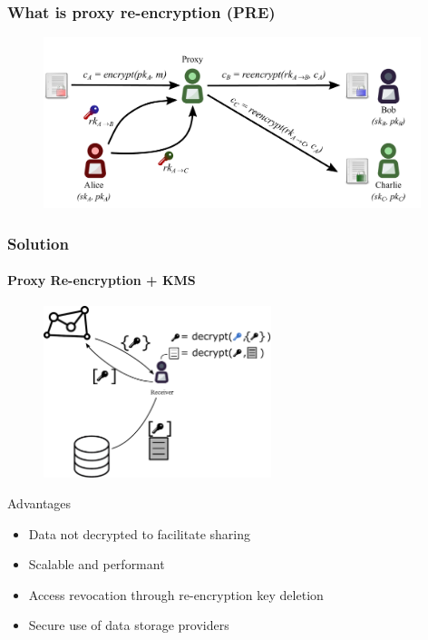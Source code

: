\documentclass[xetex,mathsans,sans]{beamer}
\begin{document}
    \begin{frame}
        \frametitle{What is proxy re-encryption (PRE)}
        \begin{figure}
            \centering
            \includegraphics[width=11cm]{pdf/pre-multi.pdf}
        \end{figure}
    \end{frame}

    \begin{frame}
        \frametitle{Solution}
        \framesubtitle{Proxy Re-encryption + KMS}
        \begin{figure}
            \centering
            \includegraphics[height=5cm]{pdf/pre-kms.pdf}
        \end{figure}

        Advantages
        \begin{itemize}
            \item Data not decrypted to facilitate sharing
            \item Scalable and performant
            \item Access revocation through re-encryption key deletion
            \item Secure use of data storage providers
        \end{itemize}
    \end{frame}
\end{document}
